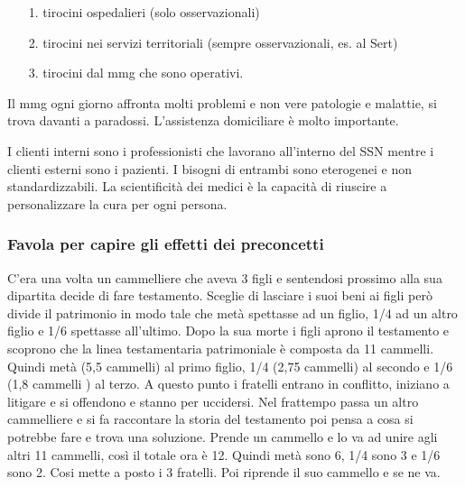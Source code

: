 \begin{itemize}
\item[1.]
  tirocini ospedalieri (solo osservazionali)
\item[2.]
  tirocini nei servizi territoriali (sempre osservazionali, es. al Sert)
\item[3.]
  tirocini dal mmg che sono operativi.
\end{itemize}

Il mmg ogni giorno affronta molti problemi e non vere patologie e
malattie, si trova davanti a paradossi. L'assistenza domiciliare è molto
importante.

I clienti interni sono i professionisti che lavorano all'interno del SSN
mentre i clienti esterni sono i pazienti. I bisogni di entrambi sono
eterogenei e non standardizzabili. La scientificità dei medici è la
capacità di riuscire a personalizzare la cura per ogni persona.

\subsubsection{Favola per capire gli effetti dei preconcetti}

C'era una volta un cammelliere che aveva 3 figli e sentendosi prossimo
alla sua dipartita decide di fare testamento. Sceglie di lasciare i suoi
beni ai figli però divide il patrimonio in modo tale che metà spettasse
ad un figlio, 1/4 ad un altro figlio e 1/6 spettasse all'ultimo. Dopo la
sua morte i figli aprono il testamento e scoprono che la linea
testamentaria patrimoniale è composta da 11 cammelli. Quindi metà (5,5
cammelli) al primo figlio, 1/4 (2,75 cammelli) al secondo e 1/6 (1,8
cammelli ) al terzo. A questo punto i fratelli entrano in conflitto,
iniziano a litigare e si offendono e stanno per uccidersi. Nel frattempo
passa un altro cammelliere e si fa raccontare la storia del testamento
poi pensa a cosa si potrebbe fare e trova una soluzione. Prende un
cammello e lo va ad unire agli altri 11 cammelli, così il totale ora è
12. Quindi metà sono 6, 1/4 sono 3 e 1/6 sono 2. Cosi mette a posto i 3
fratelli. Poi riprende il suo cammello e se ne va.
